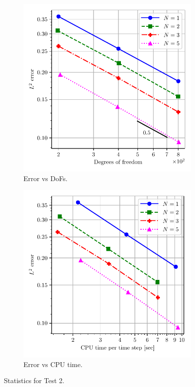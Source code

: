 \documentclass[a4paper,11pt,oneside]{article}
\begin{document}
\begin{figure}[htbp]
	\centering
	\begin{subfigure}{0.5\linewidth}
		\includegraphics[width=\linewidth]{figures/riemann_1d/test1-2/error_vs_dof_chandrashekhar.pdf}
		\caption{Error vs DoFs.}
		\label{subfig:test1-2_error_vs_dof_chandrashekhar}
	\end{subfigure}%
	\begin{subfigure}{0.5\linewidth}
		\includegraphics[width=\linewidth]{figures/riemann_1d/test1-2/error_vs_cputime_chandrashekhar.pdf}
		\caption{Error vs CPU time.}
		\label{subfig:test1-2_error_vs_cputime_chandrashekhar}
	\end{subfigure}
	\caption{Statistics for Test 2.}
	\label{fig:test1-2_error_plots_chandrashekhar}
\end{figure}
\end{document}
